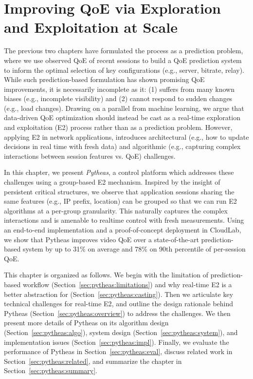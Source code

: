 \chapter{Improving QoE via Exploration and Exploitation at Scale}
\label{ch:pytheas}


\renewcommand{\name}{{Pytheas}\xspace}
\providecommand{\mab}{{E2}\xspace}
\providecommand{\mablong}{{exploration and exploitation}\xspace}
\providecommand{\control}{{control}\xspace}
\providecommand{\idea}{{group-based \mab}\xspace}
\providecommand{\Idea}{{Group-based \mab}\xspace}

The previous two chapters have formulated the \ddn process as a
prediction problem, where we use observed QoE of recent
sessions to build a QoE prediction system to inform the optimal
selection of key configurations (e.g., server, bitrate, relay). 
While such prediction-based formulation has shown promising QoE 
improvements, it is necessarily incomplete as it: (1) suffers from many known biases
(e.g., incomplete visibility) and (2) cannot respond
to sudden changes (e.g., load changes). Drawing on a parallel
from machine learning, we argue that data-driven
QoE optimization should instead be cast as a real-time
exploration and exploitation (E2) process rather than as
a prediction problem. However, applying E2 in network applications,
introduces architectural (e.g., how
to update decisions in real time with fresh data) and algorithmic
(e.g., capturing complex interactions between
session features vs. QoE) challenges. 

In this chapter, we present {\em Pytheas}, a control platform which addresses 
these challenges using a group-based E2 mechanism. 
Inspired by the insight of persistent critical structures, we
observe that application sessions sharing the same features (e.g., IP prefix, 
location) can be grouped so that we can run E2 algorithms
at a per-group granularity. This naturally captures
the complex interactions and is amenable to realtime
control with fresh measurements. Using an end-to-end
implementation and a proof-of-concept deployment
in CloudLab, we show that Pytheas improves video
QoE over a state-of-the-art prediction-based system by
up to 31\% on average and 78\% on 90th percentile of 
per-session QoE.

This chapter is organized as follows.
We begin with the limitation of prediction-based workflow (Section~\ref{sec:pytheas:limitations}) 
and why real-time \mab is a better abstraction
for \ddn (Section~\ref{sec:pytheas:casting}). Then we articulate key technical challenges 
for real-time \mab, and outline the design rationale behind \name 
(Section~\ref{sec:pytheas:overview}) to address the challenges.
We then present more details of \name on its algorithm design 
(Section~\ref{sec:pytheas:algo}), system design (Section~\ref{sec:pytheas:system}), 
and implementation issues (Section~\ref{sec:pytheas:impl}).
Finally, we evaluate the performance of \name in Section~\ref{sec:pytheas:eval}, 
discuss related work in Section~\ref{sec:pytheas:related}, and summarize the 
chapter in Section~\ref{sec:pytheas:summary}.

